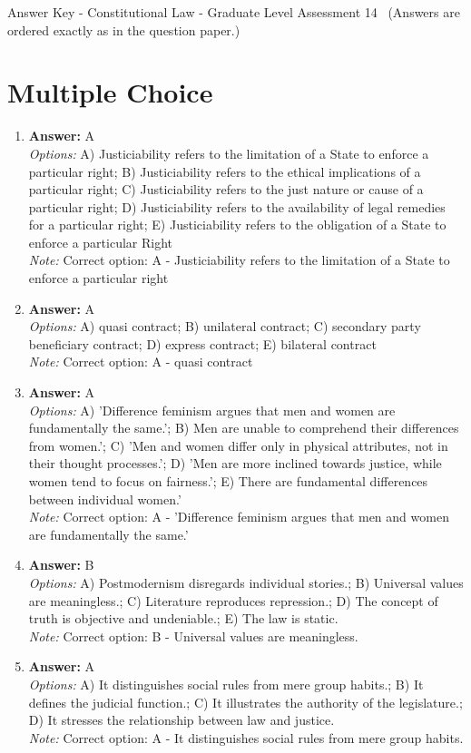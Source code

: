 \documentclass[12pt]{article}
\begin{document}
\begin{center}
Answer Key - Constitutional Law - Graduate Level Assessment 14 \
\small (Answers are ordered exactly as in the question paper.)
\end{center}

\section*{Multiple Choice}
\begin{enumerate}[label=\arabic*.]
\item \textbf{Answer:} A
\\ \textit{Options:} A) Justiciability refers to the limitation of a State to enforce a particular right; B) Justiciability refers to the ethical implications of a particular right; C) Justiciability refers to the just nature or cause of a particular right; D) Justiciability refers to the availability of legal remedies for a particular right; E) Justiciability refers to the obligation of a State to enforce a particular Right
\\ \textit{Note:} Correct option: A - Justiciability refers to the limitation of a State to enforce a particular right
\item \textbf{Answer:} A
\\ \textit{Options:} A) quasi contract; B) unilateral contract; C) secondary party beneficiary contract; D) express contract; E) bilateral contract
\\ \textit{Note:} Correct option: A - quasi contract
\item \textbf{Answer:} A
\\ \textit{Options:} A) 'Difference feminism argues that men and women are fundamentally the same.'; B) Men are unable to comprehend their differences from women.'; C) 'Men and women differ only in physical attributes, not in their thought processes.'; D) 'Men are more inclined towards justice, while women tend to focus on fairness.'; E) There are fundamental differences between individual women.'
\\ \textit{Note:} Correct option: A - 'Difference feminism argues that men and women are fundamentally the same.'
\item \textbf{Answer:} B
\\ \textit{Options:} A) Postmodernism disregards individual stories.; B) Universal values are meaningless.; C) Literature reproduces repression.; D) The concept of truth is objective and undeniable.; E) The law is static.
\\ \textit{Note:} Correct option: B - Universal values are meaningless.
\item \textbf{Answer:} A
\\ \textit{Options:} A) It distinguishes social rules from mere group habits.; B) It defines the judicial function.; C) It illustrates the authority of the legislature.; D) It stresses the relationship between law and justice.
\\ \textit{Note:} Correct option: A - It distinguishes social rules from mere group habits.
\end{enumerate}
\end{document}

